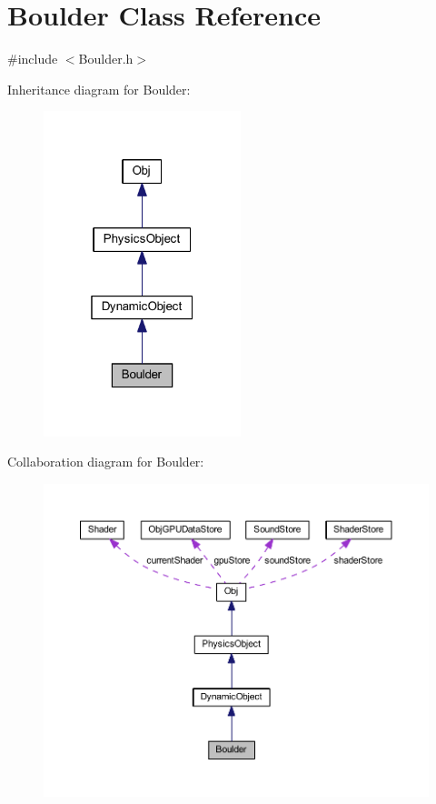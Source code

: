 \hypertarget{class_boulder}{}\section{Boulder Class Reference}
\label{class_boulder}


{\ttfamily \#include $<$Boulder.\+h$>$}



Inheritance diagram for Boulder\+:
\nopagebreak
\begin{figure}[H]
\begin{center}
\leavevmode
\includegraphics[width=163pt]{class_boulder__inherit__graph}
\end{center}
\end{figure}


Collaboration diagram for Boulder\+:
\nopagebreak
\begin{figure}[H]
\begin{center}
\leavevmode
\includegraphics[width=350pt]{class_boulder__coll__graph}
\end{center}
\end{figure}
